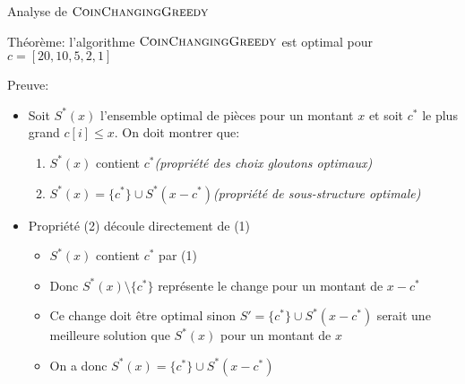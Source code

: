 \begin{frame}{Analyse de $\textnormal{\scshape CoinChangingGreedy}$}

\alert{Théorème:} l'algorithme $\textnormal{\scshape CoinChangingGreedy}$ est optimal pour $c=[20,10,5,2,1]$

\bigskip

\alert{Preuve:}
\begin{itemize}
\item Soit $S^*(x)$ l'ensemble optimal de pièces pour un montant $x$ et soit $c^*$ le plus grand $c[i]\leq x$. On doit montrer que:
\begin{enumerate}
\item $S^*(x)$ contient $c^*$\hfill{\it (propriété des choix gloutons optimaux)}
\item $S^*(x)=\{c^*\}\cup S^*(x-c^*)$\hfill{\it (propriété de sous-structure optimale)}
\end{enumerate}

\bigskip

\item Propriété (2) découle directement de (1)
\begin{itemize}
\item $S^*(x)$ contient $c^*$ par (1)
\item Donc $S^*(x)\setminus\{c^*\}$ représente le change pour un montant de $x-c^*$
\item Ce change doit être optimal sinon $S'=\{c^*\}\cup S^*(x-c^*)$ serait une meilleure solution que $S^*(x)$ pour un montant de $x$
\item On a donc $S^*(x)=\{c^*\}\cup S^*(x-c^*)$
\end{itemize}

\end{itemize}

\end{frame}

